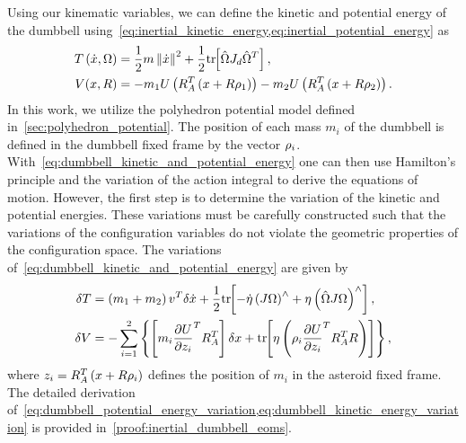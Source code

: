 Using our kinematic variables, we can define the kinetic and potential energy of the dumbbell using~\cref{eq:inertial_kinetic_energy,eq:inertial_potential_energy} as
\begin{subequations}\label{eq:dumbbell_kinetic_and_potential_energy}
\begin{align}
    T\left( \dot{x}, \Omega \right) &= \frac{1}{2} m \left\| \dot{x} \right\|^2 + \frac{1}{2} \mathrm{tr}\negthickspace\left[ \hat{\Omega} J_d \hat{\Omega}^T \right] , \label{eq:dumbbell_kinetic_energy}\\
    V( x, R ) &=  - m_1 U \left( R_A^T \left( x + R \rho_1 \right) \right) - m_2 U \left( R_A^T \left( x + R \rho_2 \right) \right). \label{eq:dumbbell_potential_energy}
\end{align}
\end{subequations}     
In this work, we utilize the polyhedron potential model defined in~\cref{sec:polyhedron_potential}.
The position of each mass \(m_i\) of the dumbbell is defined in the dumbbell fixed frame by the vector \(\rho_i\). 
With~\cref{eq:dumbbell_kinetic_and_potential_energy} one can then use Hamilton's principle  and the variation of the action integral to derive the equations of motion.
However, the first step is to determine the variation of the kinetic and potential energies.
These variations must be carefully constructed such that the variations of the configuration variables do not violate the geometric properties of the configuration space.
The variations of~\cref{eq:dumbbell_kinetic_and_potential_energy} are given by
\begin{align} 
    \delta T &= \left( m_1 + m_2 \right) v^T \delta \dot{x} + \frac{1}{2} \mathrm{tr}\negthickspace\left[ - \dot{\eta} \left( J \Omega \right)^\wedge + \eta \left( \hat{\Omega} J \Omega \right)^\wedge  \right], \label{eq:dumbbell_kinetic_energy_variation} \\
    \delta V &= - \sum_{i=1}^2 \left\{  \left[ m_i \frac{\partial U}{\partial z_i}^T R_A^T  \right] \delta x +  \mathrm{tr}\negthickspace\left[ \eta \left( \rho_i \frac{\partial U}{\partial z_i}^T R_A^T R  \right)  \right] \right\},\label{eq:dumbbell_potential_energy_variation}
\end{align}
where \( z_i = R_A^T \left( x + R \rho_i \right) \) defines the position of \( m_i \) in the asteroid fixed frame.
The detailed derivation of~\cref{eq:dumbbell_potential_energy_variation,eq:dumbbell_kinetic_energy_variation} is provided in~\cref{proof:inertial_dumbbell_eoms}.

